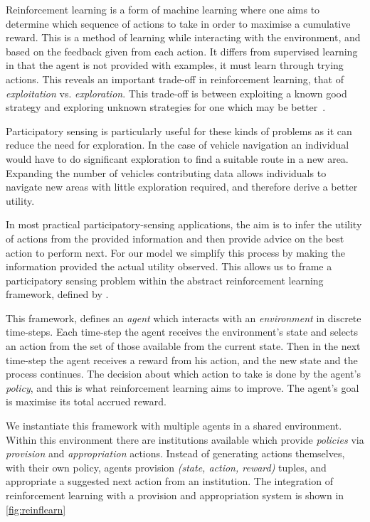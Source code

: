 Reinforcement learning is a form of machine learning where one aims to
determine which sequence of actions to take in order to maximise a cumulative
reward. This is a method of learning while interacting with the environment,
and based on the feedback given from each action. It differs from supervised
learning in that the agent is not provided with examples, it must learn
through trying actions. This reveals an important trade-off in reinforcement
learning, that of \emph{exploitation} vs. \emph{exploration}. This trade-off
is between exploiting a known good strategy and exploring unknown strategies
for one which may be better~\citep{Sutton1998}.

Participatory sensing is particularly useful for these kinds of problems as it
can reduce the need for exploration. In the case of vehicle navigation an
individual would have to do significant exploration to find a suitable route
in a new area. Expanding the number of vehicles contributing data allows
individuals to navigate new areas with little exploration required, and
therefore derive a better utility.

In most practical participatory-sensing applications, the aim is to infer the
utility of actions from the provided information and then provide advice on
the best action to perform next. For our model we simplify this process by
making the information provided the actual utility observed. This allows us
to frame a participatory sensing problem within the abstract reinforcement
learning framework, defined by \citet{Sutton1998}.

This framework, defines an \emph{agent} which interacts with an
\emph{environment} in discrete time-steps. Each time-step the agent receives
the environment's state and selects an action from the set of those available
from the current state. Then in the next time-step the agent receives a reward
from his action, and the new state and the process continues. The decision
about which action to take is done by the agent's \emph{policy}, and this is
what reinforcement learning aims to improve. The agent's goal is maximise its
total accrued reward.

We instantiate this framework with multiple agents in a shared environment.
Within this environment there are institutions available which provide
\emph{policies} via \emph{provision} and \emph{appropriation} actions. Instead
of generating actions themselves, with their own policy, agents provision
\emph{(state, action, reward)} tuples, and appropriate a suggested next action
from an institution. 
The integration of reinforcement learning with a provision and appropriation system is shown in \autoref{fig:reinflearn} %

